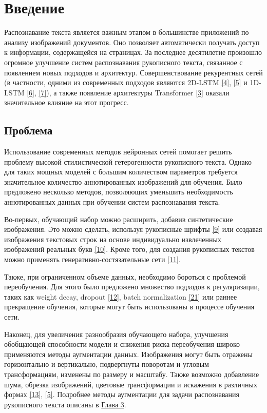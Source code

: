 \section{Введение}
\label{sec:Chapter0} 

Распознавание текста является важным этапом в большинстве приложений по анализу изображений документов. Оно позволяет автоматически получать доступ к информации, содержащейся на страницах. За последнее десятилетие произошло огромное улучшение систем распознавания рукописного текста, связанное с появлением новых подходов и архитектур. Совершенствование рекурентных сетей (в частности, одними из современных подходов являются 2D-LSTM \hyperlink{cite.Gra08}{[4]}, \hyperlink{cite.Bas14}{[5]} и 1D-LSTM \hyperlink{cite.Joa17}{[6]}, \hyperlink{cite.The17}{[7]}), а также появление архитектуры Transformer \hyperlink{cite.Vas17}{[3]} оказали значительное влияние на этот прогресс.
\subsection{Проблема}

Использование современных методов нейронных сетей помогает решить проблему высокой стилистической гетерогенности рукописного текста. Однако для таких мощных моделей с большим количеством параметров требуется значительное количество аннотированных изображений для обучения. Было предложено несколько методов, позволяющих уменьшить необходимость аннотированных данных при обучении систем распознавания текста.

Во-первых, обучающий набор можно расширить, добавив синтетические изображения. Это можно сделать, используя рукописные шрифты \hyperlink{cite.Mur03}{[9]} или создавая изображения текстовых строк на основе индивидуально извлеченных изображений реальных букв \hyperlink{cite.She16}{[10]}. Кроме того, для создания рукописных текстов можно применять генеративно-состязательные сети \hyperlink{cite.Alo19}{[11]}. 

Также, при ограниченном объеме данных, необходимо бороться с проблемой переобучения. Для этого было предложено множество подходов к регуляризации, таких как weight decay, dropout \hyperlink{cite.Sut14}{[12]}, batch normalization \hyperlink{cite.Iof15}{[21]} или раннее прекращение обучения, которые могут быть использованы в процессе обучения сети.

Наконец, для увеличения разнообразия обучающего набора, улучшения обобщающей способности модели и снижения риска переобучения широко применяются методы аугментации данных. Изображения могут быть отражены горизонтально и вертикально, подвергнуты поворотам и угловым трансформациям, изменены по размеру и масштабу. Также возможно добавление шума, обрезка изображений, цветовые трансформации и искажения в различных формах \hyperlink{cite.Cur17}{[13]}, \hyperlink{cite.Bas14}{[5]}. Подробнее методы аугментации для задачи распознавания рукописного текста описаны в \hyperref[sec:Chapter2]{Глава 3}.

